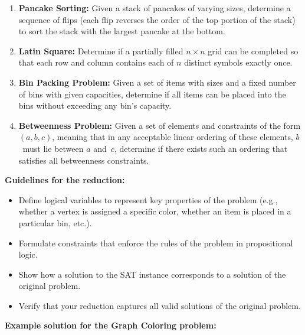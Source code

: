 \documentclass[a4paper,12pt]{article}
\begin{document}
\begin{tasks}
\begin{enumerate}[start=0]
        \item \textbf{Pancake Sorting:}
        Given a stack of pancakes of varying sizes, determine a sequence of flips (each flip reverses the order of the top portion of the stack) to sort the stack with the largest pancake at the bottom.

        \item \textbf{Latin Square:}
        Determine if a partially filled $n \times n$ grid can be completed so that each row and column contains each of $n$ distinct symbols exactly once.

        \item \textbf{Bin Packing Problem:}
        Given a set of items with sizes and a fixed number of bins with given capacities, determine if all items can be placed into the bins without exceeding any bin's capacity.

        \item \textbf{Betweenness Problem:}
        Given a set of elements and constraints of the form $(a,b,c)$, meaning that in any acceptable linear ordering of these elements, $b$~must lie between $a$ and~$c$, determine if there exists such an ordering that satisfies all betweenness constraints.
    \end{enumerate}

    \begin{minipage}{\linewidth}
    \textbf{Guidelines for the reduction:}
    \begin{itemize}
        \item Define logical variables to represent key properties of the problem (e.g., whether a vertex is assigned a specific color, whether an item is placed in a particular bin, etc.).
        \item Formulate constraints that enforce the rules of the problem in propositional logic.
        \item Show how a solution to the SAT instance corresponds to a solution of the original problem.
        \item Verify that your reduction captures all valid solutions of the original problem.
    \end{itemize}
    \end{minipage}

    \medskip
    \textbf{Example solution for the Graph Coloring problem:}


\end{tasks}
\end{document}
